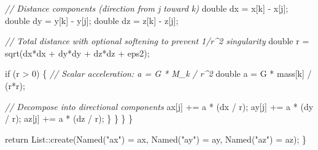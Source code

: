 \documentclass[
  10.5pt,
  letterpaper,
]{scrbook}
\newenvironment{Shaded}{\begin{snugshade}}{\end{snugshade}}
\newcommand{\CommentTok}[1]{\textcolor[rgb]{0.00,0.00,0.00}{\textit{#1}}}
\newcommand{\ControlFlowTok}[1]{\textcolor[rgb]{0.00,0.00,0.00}{#1}}
\newcommand{\DataTypeTok}[1]{\textcolor[rgb]{0.00,0.00,0.00}{#1}}
\newcommand{\DecValTok}[1]{\textcolor[rgb]{0.00,0.00,0.00}{#1}}
\newcommand{\NormalTok}[1]{\textcolor[rgb]{0.00,0.00,0.00}{#1}}
\newcommand{\OperatorTok}[1]{\textcolor[rgb]{0.00,0.00,0.00}{#1}}
\newcommand{\StringTok}[1]{\textcolor[rgb]{0.00,0.00,0.00}{#1}}
\theoremstyle{plain}
\theoremstyle{remark}
\begin{document}
\begin{Shaded}
\begin{Highlighting}[]
        \CommentTok{// Distance components (direction from j toward k)}
        \DataTypeTok{double}\NormalTok{ dx }\OperatorTok{=}\NormalTok{ x}\OperatorTok{[}\NormalTok{k}\OperatorTok{]} \OperatorTok{{-}}\NormalTok{ x}\OperatorTok{[}\NormalTok{j}\OperatorTok{];}
        \DataTypeTok{double}\NormalTok{ dy }\OperatorTok{=}\NormalTok{ y}\OperatorTok{[}\NormalTok{k}\OperatorTok{]} \OperatorTok{{-}}\NormalTok{ y}\OperatorTok{[}\NormalTok{j}\OperatorTok{];}
        \DataTypeTok{double}\NormalTok{ dz }\OperatorTok{=}\NormalTok{ z}\OperatorTok{[}\NormalTok{k}\OperatorTok{]} \OperatorTok{{-}}\NormalTok{ z}\OperatorTok{[}\NormalTok{j}\OperatorTok{];}

        \CommentTok{// Total distance with optional softening to prevent 1/r\^{}2 singularity}
        \DataTypeTok{double}\NormalTok{ r }\OperatorTok{=}\NormalTok{ sqrt}\OperatorTok{(}\NormalTok{dx}\OperatorTok{*}\NormalTok{dx }\OperatorTok{+}\NormalTok{ dy}\OperatorTok{*}\NormalTok{dy }\OperatorTok{+}\NormalTok{ dz}\OperatorTok{*}\NormalTok{dz }\OperatorTok{+}\NormalTok{ eps2}\OperatorTok{);}

        \ControlFlowTok{if} \OperatorTok{(}\NormalTok{r }\OperatorTok{\textgreater{}} \DecValTok{0}\OperatorTok{)} \OperatorTok{\{}
          \CommentTok{// Scalar acceleration: a = G * M\_k / r\^{}2}
          \DataTypeTok{double}\NormalTok{ a }\OperatorTok{=}\NormalTok{ G }\OperatorTok{*}\NormalTok{ mass}\OperatorTok{[}\NormalTok{k}\OperatorTok{]} \OperatorTok{/} \OperatorTok{(}\NormalTok{r}\OperatorTok{*}\NormalTok{r}\OperatorTok{);}

          \CommentTok{// Decompose into directional components}
\NormalTok{          ax}\OperatorTok{[}\NormalTok{j}\OperatorTok{]} \OperatorTok{+=}\NormalTok{ a }\OperatorTok{*} \OperatorTok{(}\NormalTok{dx }\OperatorTok{/}\NormalTok{ r}\OperatorTok{);}
\NormalTok{          ay}\OperatorTok{[}\NormalTok{j}\OperatorTok{]} \OperatorTok{+=}\NormalTok{ a }\OperatorTok{*} \OperatorTok{(}\NormalTok{dy }\OperatorTok{/}\NormalTok{ r}\OperatorTok{);}
\NormalTok{          az}\OperatorTok{[}\NormalTok{j}\OperatorTok{]} \OperatorTok{+=}\NormalTok{ a }\OperatorTok{*} \OperatorTok{(}\NormalTok{dz }\OperatorTok{/}\NormalTok{ r}\OperatorTok{);}
        \OperatorTok{\}}
      \OperatorTok{\}}
    \OperatorTok{\}}
  \OperatorTok{\}}

  \ControlFlowTok{return}\NormalTok{ List}\OperatorTok{::}\NormalTok{create}\OperatorTok{(}\NormalTok{Named}\OperatorTok{(}\StringTok{"ax"}\OperatorTok{)} \OperatorTok{=}\NormalTok{ ax}\OperatorTok{,}\NormalTok{ Named}\OperatorTok{(}\StringTok{"ay"}\OperatorTok{)} \OperatorTok{=}\NormalTok{ ay}\OperatorTok{,}\NormalTok{ Named}\OperatorTok{(}\StringTok{"az"}\OperatorTok{)} \OperatorTok{=}\NormalTok{ az}\OperatorTok{);}
\OperatorTok{\}}
\end{Highlighting}
\end{Shaded}
\end{document}
